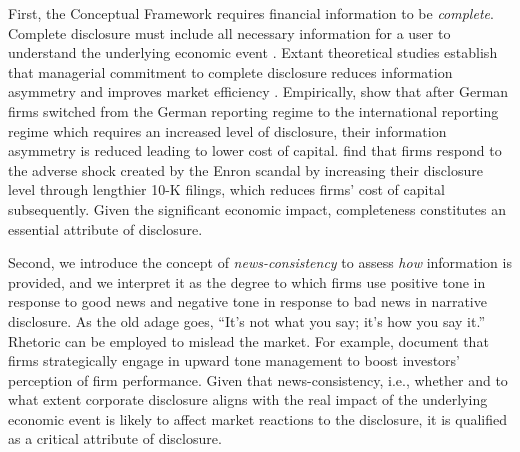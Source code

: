 \documentclass[letterpaper,11pt]{article}
\begin{document}
\begin{spacing}{1.5}
First, the Conceptual Framework requires financial information to be \textit{complete}. Complete disclosure must include all necessary information for a user to understand the underlying economic event \cite{fasbConceptualFrameworkFinancial2018}. Extant theoretical studies establish that managerial commitment to complete disclosure reduces information asymmetry and improves market efficiency \cite{glostenBidAskTransaction1985, diamondOptimalReleaseInformation1985, diamondDisclosureLiquidityCost1991, baimanRelationCapitalMarkets1996}. Empirically,  show that after German firms switched from the German reporting regime to the international reporting regime which requires an increased level of disclosure, their information asymmetry is reduced leading to lower cost of capital.  find that firms respond to the adverse shock created by the Enron scandal by increasing their disclosure level through lengthier 10-K filings, which reduces firms' cost of capital subsequently. Given the significant economic impact, completeness constitutes an essential attribute of disclosure.

Second, we introduce the concept of \textit{news-consistency} to assess \textit{how} information is provided, and we interpret it as the degree to which firms use positive tone in response to good news and negative tone in response to bad news in narrative disclosure. As the old adage goes, ``It's not what you say; it's how you say it.'' Rhetoric can be employed to mislead the market. For example,  document that firms strategically engage in upward tone management to boost investors' perception of firm performance. Given that news-consistency, i.e., whether and to what extent corporate disclosure aligns with the real impact of the underlying economic event is likely to affect market reactions to the disclosure, it is qualified as a critical attribute of disclosure. 


\end{spacing}
\end{document}
